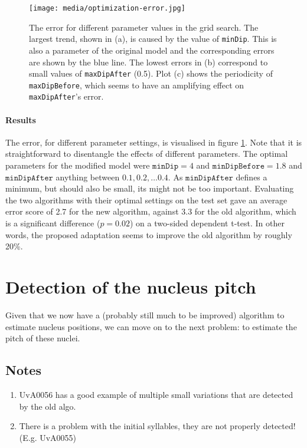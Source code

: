 \documentclass[a4paper,9pt]{article}
\begin{document}
\begin{figure}	
	\hspace{-.15\textwidth}
	\texttt{[image: media/optimization-error.jpg]}
	\caption{The error for different parameter values in the grid search. The largest trend, shown in (a), is caused by the value of \texttt{minDip}. This is also a parameter of the original model and the corresponding errors are shown by the blue line.
	 The lowest errors in (b) correspond to small values of \texttt{maxDipAfter} (0.5). Plot (c) shows the periodicity of \texttt{maxDipBefore}, which seems to have an amplifying effect on \texttt{maxDipAfter}'s error.\label{fig:error}}
\end{figure}

\paragraph{Results}
The error, for different parameter settings, is visualised in figure \ref{fig:error}. Note that it is straightforward to disentangle the effects of different parameters. The optimal parameters for the modified model were $\texttt{minDip}=4$ and $\texttt{minDipBefore} = 1.8$ and $\texttt{minDipAfter}$ anything between $0.1, 0.2, \dots 0.4$. As $\texttt{minDipAfter}$ defines a minimum, but should also  be small, its might not be too important. Evaluating the two algorithms with their optimal settings on the test set gave an average error score of 2.7 for the new algorithm, against 3.3 for the old algorithm, which is a significant difference ($p=0.02$) on a two-sided dependent t-test. In other words, the proposed adaptation seems to improve the old algorithm by roughly 20\%.


\section{Detection of the nucleus pitch}
Given that we now have a (probably still much to be improved) algorithm to estimate nucleus positions, we can move on to the next problem: to estimate the pitch of these nuclei. 

\newpage

\subsection{Notes}
\begin{enumerate}
\item UvA0056 has a good example of multiple small variations that are detected by the old algo.
\item There is a problem with the initial syllables, they are not properly detected! (E.g. UvA0055)
\end{enumerate}

\begin{multicols}{2}
\printbibliography
\end{multicols}
\end{document}
